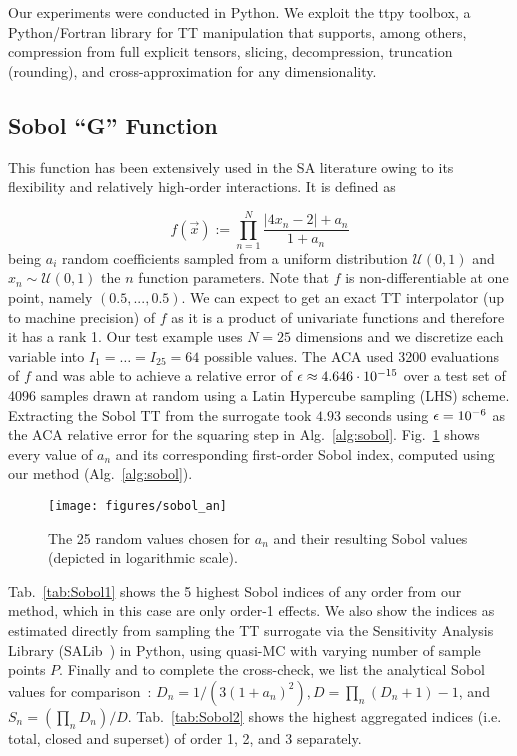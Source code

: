 \documentclass[review, twocolumn]{svjour3}          %
\newcommand{\FIXME}[1]{{\color{RED}{\textbf{FIX}: #1}}}
\begin{document}
Our experiments were conducted in Python. We exploit the ttpy toolbox\cite{ttpy}, a Python/Fortran library for TT manipulation that supports, among others, compression from full explicit tensors, slicing, decompression, truncation (rounding), and cross-approximation for any dimensionality.


\subsection{Sobol ``G'' Function}

This function has been extensively used in the SA literature owing to its flexibility and relatively high-order interactions. It is defined as

\begin{equation}
\label{eq:sobol}
f(\vec{x}) := \prod_{n=1}^N \frac{|4 x_n - 2| + a_n}{1 + a_n}
\end{equation}
%
being $a_i$ random coefficients sampled from a uniform distribution $\mathcal{U}(0, 1)$ and $x_n \sim \mathcal{U}(0, 1)$ the  $n$ function parameters. Note that $f$ is non-differentiable at one point, namely $(0.5, ..., 0.5)$. We can expect to get an exact TT interpolator (up to machine precision) of $f$ as it is a product of univariate functions and therefore it has a rank 1. Our test example uses $N = 25$ dimensions and we discretize each variable into $I_1 = \dots = I_{25} = 64$ possible values. The ACA used 3200 evaluations of $f$ and was able to achieve a relative error of $\mbox{$\epsilon$} \approx 4.646 \cdot 10^{-15}$ over a test set of 4096 samples drawn at random using a Latin Hypercube sampling (LHS) scheme. Extracting the Sobol TT from the surrogate took $4.93$ seconds using $\mbox{$\epsilon$} = 10^{-6}$ as the ACA relative error for the squaring step in Alg.~\ref{alg:sobol}. Fig.~\ref{fig:sobol_an} shows every value of $a_n$ and its corresponding first-order Sobol index, computed using our method (Alg.~\ref{alg:sobol}).

\begin{figure}[h]\center
	\texttt{[image: figures/sobol\_an]}
	\caption{The 25 random values chosen for $a_n$ and their resulting Sobol values (depicted in logarithmic scale).}
	\label{fig:sobol_an}
\end{figure}

Tab.~\ref{tab:Sobol1} shows the 5 highest Sobol indices of any order from our method, which in this case are only order-1 effects. We also show the indices as estimated directly from sampling the TT surrogate via the Sensitivity Analysis Library (SALib~\cite{HU:17}) in Python, using quasi-MC with varying number of sample points $P$. Finally and to complete the cross-check, we list the analytical Sobol values for comparison~\cite{Sobol:03}: $D_n = 1/(3(1+a_n)^2), D = \prod_n (D_n+1) - 1$, and $S_n = (\prod_n D_n)/D$. Tab.~\ref{tab:Sobol2} shows the highest aggregated indices (i.e. total, closed and superset) of order 1, 2, and 3 separately.
\end{document}
